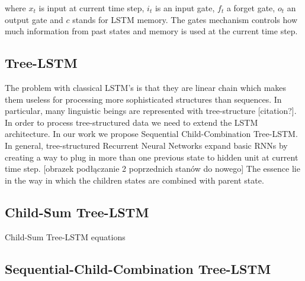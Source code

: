 \documentclass[10pt, a4paper]{article}
\begin{document}
		where $x_t$ is input at current time step, $i_t$ is an input gate, $f_t$ a forget gate, $o_t$ an output gate and $c$ stands for LSTM memory.
		The gates mechanism controls how much information from past states and memory is used at the current time step. 

\subsection{Tree-LSTM}
	The problem with classical LSTM's is that they are linear chain which makes them useless for processing more sophisticated structures than sequences. In particular, many linguistic beings are represented with tree-structure [citation?].
	In order to process tree-structured data we need to extend the LSTM architecture. In our work we propose Sequential Child-Combination Tree-LSTM.
	In general, tree-structured Recurrent Neural Networks expand basic RNNs by creating a way to plug in more than one previous state to hidden unit at current time step.
	[obrazek podłączanie 2 poprzednich stanów do nowego]
	The essence lie in the way in which the children states are combined with parent state.

\subsection{Child-Sum Tree-LSTM}
Child-Sum Tree-LSTM equations \cite{tai2015improved}

	
\subsection{Sequential-Child-Combination Tree-LSTM}
\end{document}
